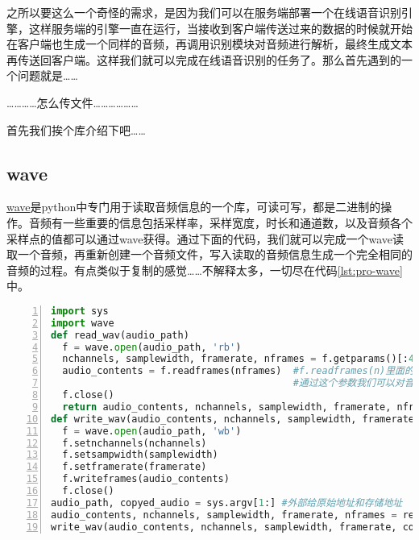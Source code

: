 之所以要这么一个奇怪的需求，是因为我们可以在服务端部署一个在线语音识别引擎，这样服务端的引擎一直在运行，当接收到客户端传送过来的数据的时候就开始在客户端也生成一个同样的音频，再调用识别模块对音频进行解析，最终生成文本再传送回客户端。这样我们就可以完成在线语音识别的任务了。那么首先遇到的一个问题就是……

…………怎么传文件………………

首先我们挨个库介绍下吧……

\subsection{wave}
\href{https://docs.python.org/zh-cn/3/library/wave.html}{wave}是python中专门用于读取音频信息的一个库，可读可写，都是二进制的操作。音频有一些重要的信息包括采样率，采样宽度，时长和通道数，以及音频各个采样点的值都可以通过wave获得。通过下面的代码，我们就可以完成一个wave读取一个音频，再重新创建一个音频文件，写入读取的音频信息生成一个完全相同的音频的过程。有点类似于复制的感觉……不解释太多，一切尽在代码\ref{lst:pro-wave}中。
\begin{lstlisting}[language = python, label={lst:pro-wave}, caption={wave库读取和写入音频}, numbers=left, 
       numberstyle=\tiny,keywordstyle=\color{blue!70},
       commentstyle=\color{red!50!green!50!blue!50},frame=shadowbox,
       rulesepcolor=\color{red!20!green!20!blue!20},basicstyle=\ttfamily]
import sys
import wave
def read_wav(audio_path)
  f = wave.open(audio_path, 'rb')
  nchannels, samplewidth, framerate, nframes = f.getparams()[:4]
  audio_contents = f.readframes(nframes)  #f.readframes(n)里面的n是帧数，
                                          #通过这个参数我们可以对音频进行裁剪
  f.close()  
  return audio_contents, nchannels, samplewidth, framerate, nframes
def write_wav(audio_contents, nchannels, samplewidth, framerate, audio_path)
  f = wave.open(audio_path, 'wb')
  f.setnchannels(nchannels)
  f.setsampwidth(samplewidth)
  f.setframerate(framerate)
  f.writeframes(audio_contents)
  f.close()
audio_path, copyed_audio = sys.argv[1:] #外部给原始地址和存储地址
audio_contents, nchannels, samplewidth, framerate, nframes = read_wav(audio_path)
write_wav(audio_contents, nchannels, samplewidth, framerate, copyed_audio)
\end{lstlisting}

